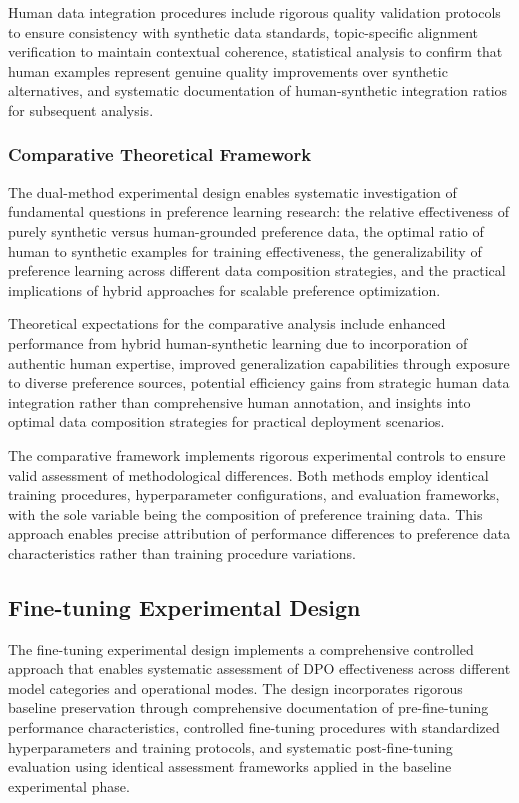 Human data integration procedures include rigorous quality validation protocols to ensure consistency with synthetic data standards, topic-specific alignment verification to maintain contextual coherence, statistical analysis to confirm that human examples represent genuine quality improvements over synthetic alternatives, and systematic documentation of human-synthetic integration ratios for subsequent analysis.

\subsubsection{Comparative Theoretical Framework}

The dual-method experimental design enables systematic investigation of fundamental questions in preference learning research: the relative effectiveness of purely synthetic versus human-grounded preference data, the optimal ratio of human to synthetic examples for training effectiveness, the generalizability of preference learning across different data composition strategies, and the practical implications of hybrid approaches for scalable preference optimization.

Theoretical expectations for the comparative analysis include enhanced performance from hybrid human-synthetic learning due to incorporation of authentic human expertise, improved generalization capabilities through exposure to diverse preference sources, potential efficiency gains from strategic human data integration rather than comprehensive human annotation, and insights into optimal data composition strategies for practical deployment scenarios.

The comparative framework implements rigorous experimental controls to ensure valid assessment of methodological differences. Both methods employ identical training procedures, hyperparameter configurations, and evaluation frameworks, with the sole variable being the composition of preference training data. This approach enables precise attribution of performance differences to preference data characteristics rather than training procedure variations.

\subsection{Fine-tuning Experimental Design}

The fine-tuning experimental design implements a comprehensive controlled approach that enables systematic assessment of DPO effectiveness across different model categories and operational modes. The design incorporates rigorous baseline preservation through comprehensive documentation of pre-fine-tuning performance characteristics, controlled fine-tuning procedures with standardized hyperparameters and training protocols, and systematic post-fine-tuning evaluation using identical assessment frameworks applied in the baseline experimental phase.

